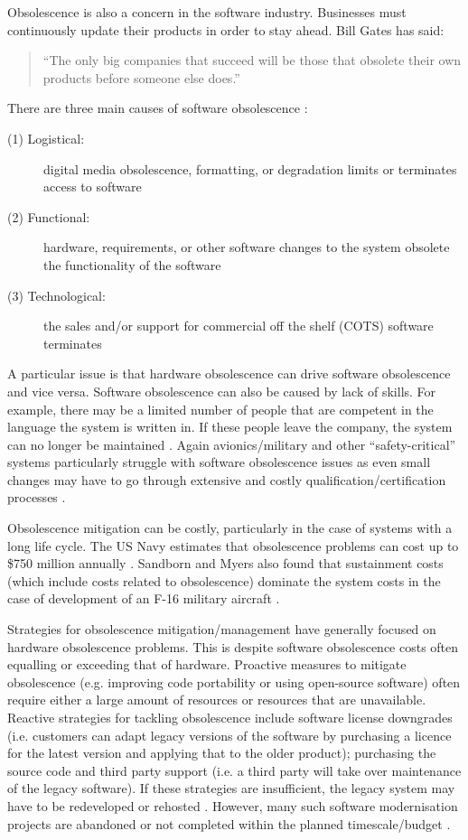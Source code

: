 \documentclass{UoYCSproject}
\begin{document}
Obsolescence is also a concern in the software industry. Businesses must continuously update their products in order to stay ahead. Bill Gates has said: 
\begin{quote}
``The only big companies that succeed will be those that obsolete their own products before someone else does.'' \parencite{bartels2012strategies}
\end{quote}
There are three main causes of software obsolescence \parencite{sandborn2007obsolescence}:
\begin{description}
\item[(1) Logistical:] digital media obsolescence, formatting, or degradation limits or terminates access to software
\item[(2) Functional:] hardware, requirements, or other software changes to the system obsolete the functionality of the software
\item[(3) Technological:]  the sales and/or support for commercial off the shelf (COTS) software terminates
\end{description}
A particular issue is that hardware obsolescence can drive software obsolescence and vice versa. Software obsolescence can also be caused by lack of skills. For example, there may be a limited number of people that are competent in the language the system is written in. If these people leave the company, the system can no longer be maintained \parencite{rajagopal2014software}. Again avionics/military and other ``safety-critical'' systems particularly struggle with software obsolescence issues as even small changes may have to go through extensive and costly qualification/certification processes \parencite{singh2006obsolescence}.

Obsolescence mitigation can be costly, particularly in the case of systems with a long life cycle. The US Navy estimates that obsolescence problems can cost up to \$750 million annually \parencite{adams2005getting}. Sandborn and Myers also found that sustainment costs (which include costs related to obsolescence) dominate the system costs in the case of development of an F-16 military aircraft \parencite{sandborn2008designing}. 
 
Strategies for obsolescence mitigation/management have generally focused on hardware obsolescence problems. This is despite software obsolescence costs often equalling or exceeding that of hardware. Proactive measures to mitigate obsolescence (e.g. improving code portability or using open-source software) often require either a large amount of resources or resources that are unavailable. Reactive strategies for tackling obsolescence include software license downgrades (i.e. customers can adapt legacy versions of the software by purchasing a licence for the latest version and applying that to the older product); purchasing the source code and third party support (i.e. a third party will take over maintenance of the legacy software). If these strategies are insufficient, the legacy system may have to be redeveloped or rehosted \parencite{sandborn2007obsolescence}. However, many such software modernisation projects are abandoned or not completed within the planned timescale/budget \parencite{kowalczyk2009model}. 
\end{document}
